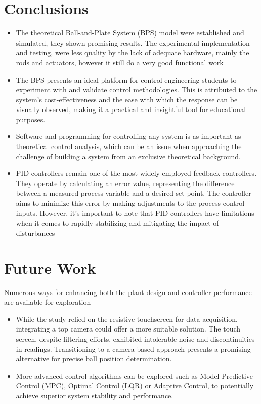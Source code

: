 
\section{Conclusions}
\begin{itemize}
    \item The theoretical Ball-and-Plate System (BPS) model were established and simulated, they shown promising results. The experimental implementation and testing, were less quality by the lack of adequate hardware, mainly the rods and actuators, however it still do a very good functional work 
    
    \item The BPS presents an ideal platform for control engineering students to experiment with and validate control methodologies. This is attributed to the system's cost-effectiveness and the ease with which the response can be visually observed, making it a practical and insightful tool for educational purposes.

    \item Software and programming for controlling any system is as important as theoretical control analysis, which can be an issue when approaching the challenge of building a system from an exclusive theoretical background.

    \item PID controllers remain one of the most widely employed feedback controllers. They operate by calculating an error value, representing the difference between a measured process variable and a desired set point. The controller aims to minimize this error by making adjustments to the process control inputs. However, it's important to note that PID controllers have limitations when it comes to rapidly stabilizing and mitigating the impact of disturbances  
\end{itemize}

\section{Future Work}
Numerous ways for enhancing both the plant design and controller performance are available for exploration

\begin{itemize}
    \item While the study relied on the resistive touchscreen for data acquisition, integrating a top camera could offer a more suitable solution. The touch screen, despite filtering efforts, exhibited intolerable noise and discontinuities in readings. Transitioning to a camera-based approach presents a promising alternative for precise ball position determination.

    \item  More advanced control algorithms can be explored such as Model Predictive Control (MPC), Optimal Control (LQR) or  Adaptive Control, to potentially achieve superior system stability and performance.


\end{itemize}
